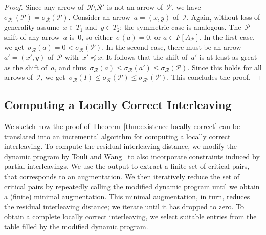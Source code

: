 \documentclass[11pt]{article}
\newcommand{\shift}[1]{\sigma_{#1}}
\newcommand{\I}{\mathcal{I}}
\renewcommand{\P}{\mathcal{P}}
\newcommand{\R}{\mathcal{R}}
\begin{document}
\begin{proof}
    Since any arrow of~$\R \setminus \R'$ is not an arrow of~$\P$, we have~$\shift{\R'}(\P) = \shift{\R}(\P)$.
    Consider an arrow~$a = (x, y)$ of~$\I$.
    Again, without loss of generality assume~$x \in T_1$ and~$y \in T_2$; the symmetric case is analogous.
    The~$\P$-shift of any arrow~$a$ is~$0$, so either~$\shift{}(a) = 0$, or $a \in F[A_\P]$.
    In the first case, we get~$\shift{\R}(a) = 0 < \shift{\R}(\P)$.
    In the second case, there must be an arrow~$a' = (x',y)$ of~$\P$ with~$x' \preceq x$.
    It follows that the shift of~$a'$ is at least as great as the shift of~$a$, and thus~$\shift{\R}(a) \le \shift{\R}(a') \le \shift{\R}(\P)$.
    Since this holds for all arrows of~$\I$, we get~$\shift{\R}(I) \le \shift{\R}(\P) \le \shift{\R'}(\P)$.
    This concludes the proof.
\end{proof}
%
\subsection{Computing a Locally Correct Interleaving}\label{sec:computing}
We sketch how the proof of Theorem~\ref{thm:existence-locally-correct} can be translated into an incremental algorithm for computing a locally correct interleaving.
To compute the residual interleaving distance, we modify the dynamic program by Touli and Wang~\cite{touli2022fpt} to also incorporate constraints induced by partial interleavings.
We use the output to extract a finite set of critical pairs, that corresponds to an augmentation.
We then iteratively reduce the set of critical pairs by repeatedly calling the modified dynamic program until we obtain a (finite) minimal augmentation.
This minimal augmentation, in turn, reduces the residual interleaving distance; we iterate until it has dropped to zero.
To obtain a complete locally correct interleaving, we select suitable entries from the table filled by the modified dynamic program.
%
\end{document}

